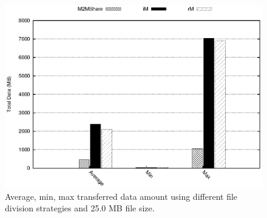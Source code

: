 \begin{figure}[ht]
\begin{center}
\begin{minipage}[b]{0.5\linewidth}
\centering
\includegraphics[scale=0.5]{grafici/dataDFS_25MB.eps}
\caption{Average, min, max transferred data amount using different file division strategies and 25.0 MB file size.}
\label{graficoDataFDS_25MB}
\end{minipage}
\end{center}
\end{figure}

%
%

 

